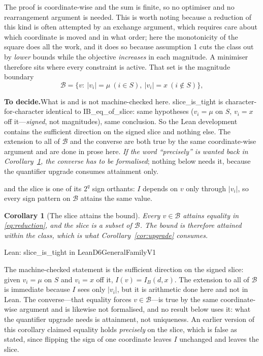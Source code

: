 \documentclass[conference]{IEEEtran}
\newtheorem{corollary}[theorem]{Corollary}
\theoremstyle{definition}
\newcommand{\lean}[1]{\textsf{\footnotesize #1}}
\newcommand{\leanbox}[1]{%
  \par\vspace{2pt}\noindent
  {\footnotesize\textsf{Lean: #1}}\par\vspace{2pt}}
\newif\ifshownotes\shownotestrue
\newcommand{\TODOPAR}[1]{\ifshownotes\par\vspace{2pt}\noindent%
  {\color{todocol}\textsf{\footnotesize\textbf{To decide.}\;#1}}\par\vspace{2pt}\fi}
\begin{document}
The proof is coordinate-wise and the sum is finite, so no optimiser and no rearrangement
argument is needed. This is worth noting because a reduction of this kind is often attempted
by an exchange argument, which requires care about which coordinate is moved and in what
order; here the monotonicity of the square does all the work, and it does so because
assumption 1 cuts the class out by \emph{lower} bounds while the objective \emph{increases}
in each magnitude. A minimiser therefore sits where every constraint is active. That set is the magnitude
boundary
\begin{equation}
\mathcal{B}=\{v:\ |v_{i}|=\mu\ (i\in S),\ |v_{i}|=x\ (i\notin S)\},
\label{eq:boundary}
\end{equation}
\TODOPAR{What is and is not machine-checked here. \lean{slice\_is\_tight} is
character-for-character identical to \lean{IB\_eq\_of\_slice}: same hypotheses
($v_{i}=\mu$ on $S$, $v_{i}=x$ off it---\emph{signed}, not magnitudes), same conclusion. So
the Lean development contains the sufficient direction on the signed slice and nothing else.
The extension to all of $\mathcal{B}$ and the converse are both true by the same
coordinate-wise argument and are done in prose here. \emph{If the word ``precisely'' is wanted
back in Corollary~\ref{cor:tight}, the converse has to be formalised}; nothing below needs it,
because the quantifier upgrade consumes attainment only.}
and the slice is one of its $2^{q}$ sign orthants: $I$ depends on $v$ only through
$|v_{i}|$, so every sign pattern on $\mathcal{B}$ attains the same value.

\begin{corollary}[The slice attains the bound]
\label{cor:tight}
Every $v\in\mathcal{B}$ attains equality in \eqref{eq:reduction}, and the slice is a subset
of $\mathcal{B}$. The bound is therefore attained within the class, which is what
Corollary~\ref{cor:upgrade} consumes.
\end{corollary}

\leanbox{\lean{slice\_is\_tight} in \lean{LeanD6GeneralFamilyV1}}

The machine-checked statement is the sufficient direction on the signed slice: given
$v_{i}=\mu$ on $S$ and $v_{i}=x$ off it, $I(v)=I_{B}(d,x)$. The extension to all of
$\mathcal{B}$ is immediate because $I$ sees only $|v_{i}|$, but it is arithmetic done here
and not in Lean. The converse---that equality forces $v\in\mathcal{B}$---is true by the same
coordinate-wise argument and is likewise not formalised, and no result below uses it: what
the quantifier upgrade needs is attainment, not uniqueness. An earlier version of this
corollary claimed equality holds \emph{precisely} on the slice, which is false as stated,
since flipping the sign of one coordinate leaves $I$ unchanged and leaves the slice.
\end{document}

